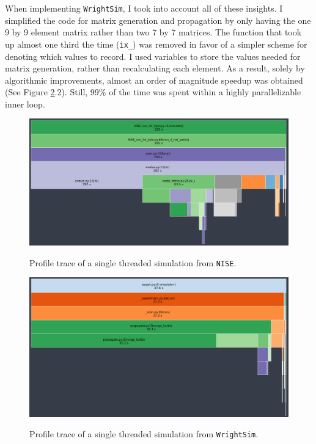 \documentclass[fontsize=11pt]{scrartcl}
\numberwithin{equation}{section}		%
\numberwithin{figure}{section}			%
\numberwithin{table}{section}				%
\begin{document}
When implementing \texttt{WrightSim}, I took into account all of these insights.
I simplified the code for matrix generation and propagation by only having the one 9 by 9 element matrix rather than two 7 by 7 matrices.
The function that took up almost one third the time (\texttt{ix\_}) was removed in favor of a simpler scheme for denoting which values to record.
I used variables to store the values needed for matrix generation, rather than recalculating each element.
As a result, solely by algorithmic improvements, almost an order of magnitude speedup was obtained (See Figure \ref{fig:snakeviz2}.2).
Still, 99\% of the time was spent within a highly parallelizable inner loop.


\begin{figure}[!h]
    \centering
    \includegraphics[scale=0.25]{"NISE_prof"}
    \label{fig:snakeviz}
    \caption{Profile trace of a single threaded simulation from \texttt{NISE}.}
\end{figure}
\begin{figure}[!h]
    \centering
    \includegraphics[scale=0.25]{"WrightSim_prof"}
    \label{fig:snakeviz2}
    \caption{Profile trace of a single threaded simulation from \texttt{WrightSim}.}
\end{figure}
\end{document}
